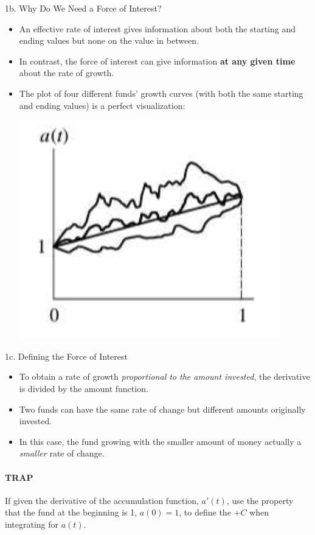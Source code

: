 \begin{CHPT_SUMM_AUTO}[label = {L.-1b}]{1b. Why Do We Need a Force of Interest?}
	\begin{itemize}[leftmargin = *]
		\item	An effective rate of interest gives information about both the starting and ending values but none on the value in between.
		\item	In contrast, the force of interest can give information \textbf{at any given time} about the rate of growth.
		\item	The plot of four different funds' growth curves (with both the same starting and ending values) is a perfect visualization:
		\begin{center}
			\includegraphics[scale=0.6]{img/annuities-force.png}
		\end{center}
	\end{itemize}
\end{CHPT_SUMM_AUTO}

\begin{CHPT_SUMM_AUTO}[label = {L.-1c}]{1c. Defining the Force of Interest}
	\begin{itemize}[leftmargin = *]
		\item	To obtain a rate of growth \textit{proportional to the amount invested}, the derivative is divided by the amount function.
		\item	Two funds can have the same rate of change but different amounts originally invested.
		\item	In this case, the fund growing with the smaller amount of money actually a \textit{smaller} rate of change.
	\end{itemize}
	
\paragraph{TRAP} If given the derivative of the accumulation function, $a'(t)$, use the property that the fund at the beginning is 1, $a(0) = 1$, to define the $+ C$ when integrating for $a(t)$.
\end{CHPT_SUMM_AUTO}

